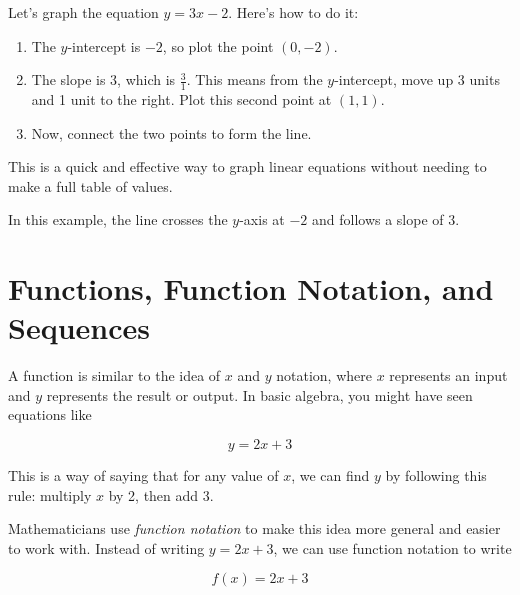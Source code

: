 \documentclass[12pt]{article}
\begin{document}
Let's graph the equation \( y = 3x - 2 \). Here's how to do it:

\begin{enumerate}
  \item The $y$-intercept is $-2$, so plot the point $(0, -2)$.
  \item The slope is $3$, which is $\frac{3}{1}$. This means from the
        $y$-intercept, move up 3 units and 1 unit to the right. Plot this second
        point at $(1, 1)$.
  \item Now, connect the two points to form the line.
\end{enumerate}

This is a quick and effective way to graph linear equations without needing to
make a full table of values.

\begin{center}
\end{center}

In this example, the line crosses the $y$-axis at $-2$ and follows a slope of
$3$.

\section{Functions, Function Notation, and Sequences}

A function is similar to the idea of $x$ and $y$ notation, where $x$ represents
an input and $y$ represents the result or output. In basic algebra, you might
have seen equations like

\[
  y = 2x + 3
\]

This is a way of saying that for any value of $x$, we can find $y$ by following
this rule: multiply $x$ by 2, then add 3.

Mathematicians use \emph{function notation} to make this idea more general and
easier to work with. Instead of writing $y = 2x + 3$, we can use function
notation to write

\[
  f(x) = 2x + 3
\]
\end{document}
